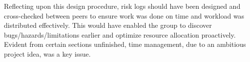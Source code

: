 Reflecting upon this design procedure, risk logs should have been designed and cross-checked between peers to ensure work was done on time and workload was distributed effectively. This would have enabled the  group to discover bugs/hazards/limitations earlier and optimize resource allocation proactively. Evident from certain sections unfinished, time management, due to an ambitious project idea, was a key issue.